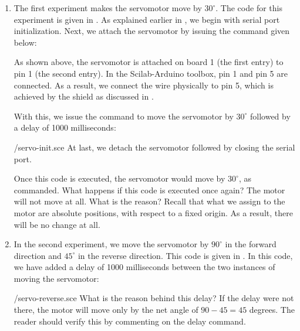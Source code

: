 \begin{enumerate}
  \item The first experiment makes the servomotor move by $30^\circ$. The code for this experiment is
        given in . As explained earlier in , 
        we begin with serial port initialization.
        Next, we attach the servomotor by issuing the command given below:
        
        As shown above, the servomotor is attached on board 1 (the first entry)
        to pin 1 (the second entry).  In the Scilab-Arduino toolbox, pin 1 and pin
        5 are connected. As a result, we connect the wire physically to
        pin 5, which is achieved by the shield as discussed in .
        
        With this, we issue the command to move the servomotor by $30^\circ$ followed by a delay of 
        1000 milliseconds:
        
        {\LocSERscicode/servo-init.sce}
        At last, we  detach the servomotor followed by closing the serial port. 
        
        Once this code is executed, the servomotor would move by
        $30^\circ$, as commanded.  What happens if this code is executed
        once again?  The motor will not move at all.  What is the reason?
        Recall that what we assign to the motor are absolute positions, with
        respect to a fixed origin.  As a result, there will be no change at
        all. 
        
  \item In the second experiment, we move the servomotor by $90^\circ$ in the
        forward direction and $45^\circ$ in the reverse direction.  This
        code is given in .  In this code, 
        we have added a delay of 1000 milliseconds between the two instances of 
        moving the servomotor: 
        
        {\LocSERscicode/servo-reverse.sce}
        What is the reason behind this delay?  If the delay were not
        there, the motor will move only by the net angle of $90-45 = 45$
        degrees.  The reader should verify this by commenting on the delay
        command. 
        

\end{enumerate}
